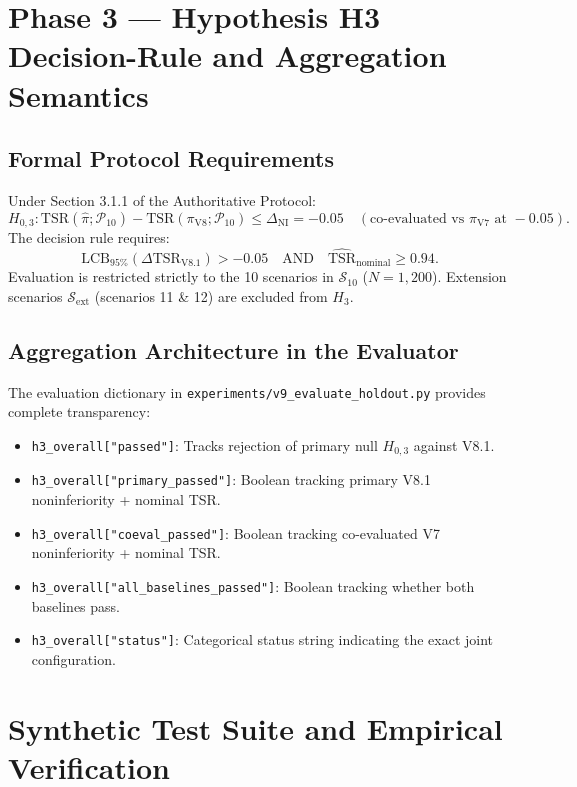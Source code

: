 \documentclass[10pt,a4paper]{article}
\begin{document}
\section{Phase 3 — Hypothesis H3 Decision-Rule and Aggregation Semantics}

\subsection{Formal Protocol Requirements}
Under Section 3.1.1 of the Authoritative Protocol:
\begin{equation}
    H_{0,3}: \mathrm{TSR}(\hat{\pi}; \mathcal{P}_{10}) - \mathrm{TSR}(\pi_{\mathrm{V8}}; \mathcal{P}_{10}) \le \Delta_{\mathrm{NI}} = -0.05 \quad (\text{co-evaluated vs } \pi_{\mathrm{V7}} \text{ at } -0.05).
\end{equation}
The decision rule requires:
\begin{equation}
    \mathrm{LCB}_{95\%}(\Delta\mathrm{TSR}_{\mathrm{V8.1}}) > -0.05 \quad \text{AND} \quad \widehat{\mathrm{TSR}}_{\mathrm{nominal}} \ge 0.94.
\end{equation}
Evaluation is restricted strictly to the 10 scenarios in $\mathcal{S}_{10}$ ($N=1,200$). Extension scenarios $\mathcal{S}_{\mathrm{ext}}$ (scenarios 11 \& 12) are excluded from $H_3$.

\subsection{Aggregation Architecture in the Evaluator}
The evaluation dictionary in \texttt{experiments/v9\_evaluate\_holdout.py} provides complete transparency:
\begin{itemize}
    \item \texttt{h3\_overall["passed"]}: Tracks rejection of primary null $H_{0,3}$ against V8.1.
    \item \texttt{h3\_overall["primary\_passed"]}: Boolean tracking primary V8.1 noninferiority + nominal TSR.
    \item \texttt{h3\_overall["coeval\_passed"]}: Boolean tracking co-evaluated V7 noninferiority + nominal TSR.
    \item \texttt{h3\_overall["all\_baselines\_passed"]}: Boolean tracking whether both baselines pass.
    \item \texttt{h3\_overall["status"]}: Categorical status string indicating the exact joint configuration.
\end{itemize}

\section{Synthetic Test Suite and Empirical Verification}
\end{document}

